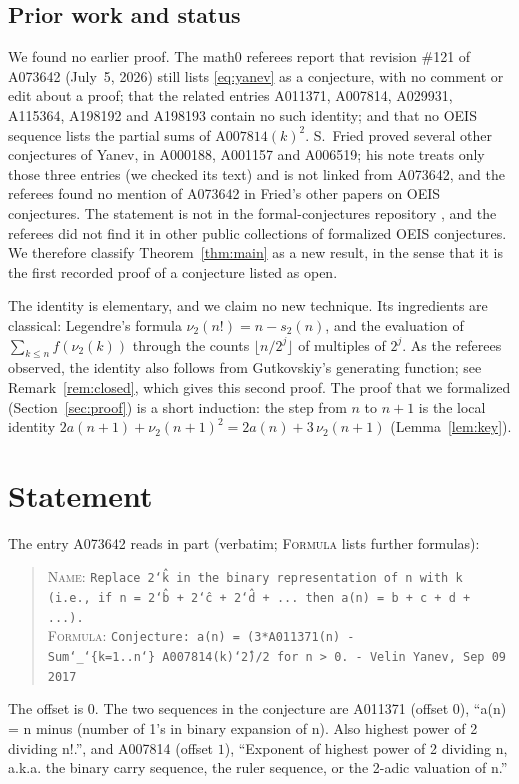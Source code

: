 \documentclass[11pt]{amsart}
\theoremstyle{plain}
\theoremstyle{definition}
\newcommand{\vt}{\nu_2}
\begin{document}
\subsection*{Prior work and status}
We found no earlier proof. The math0 referees report that revision \#121 of A073642 (July~5, 2026) still lists \eqref{eq:yanev} as a conjecture, with no comment or edit about a proof; that the related entries A011371, A007814, A029931, A115364, A198192 and A198193 contain no such identity; and that no OEIS sequence lists the partial sums of $\mathrm{A007814}(k)^2$. S.~Fried \cite{Fried} proved several other conjectures of Yanev, in A000188, A001157 and A006519; his note treats only those three entries (we checked its text) and is not linked from A073642, and the referees found no mention of A073642 in Fried's other papers on OEIS conjectures. The statement is not in the formal-conjectures repository \cite{FC}, and the referees did not find it in other public collections of formalized OEIS conjectures. We therefore classify Theorem~\ref{thm:main} as a new result, in the sense that it is the first recorded proof of a conjecture listed as open.

The identity is elementary, and we claim no new technique. Its ingredients are classical: Legendre's formula $\vt(n!)=n-s_2(n)$, and the evaluation of $\sum_{k\le n}f(\vt(k))$ through the counts $\lfloor n/2^j\rfloor$ of multiples of $2^j$. As the referees observed, the identity also follows from Gutkovskiy's generating function; see Remark~\ref{rem:closed}, which gives this second proof. The proof that we formalized (Section~\ref{sec:proof}) is a short induction: the step from $n$ to $n+1$ is the local identity $2a(n+1)+\vt(n+1)^2=2a(n)+3\,\vt(n+1)$ (Lemma~\ref{lem:key}).

\section{Statement}\label{sec:statement}

The entry A073642 \cite{A073642} reads in part (verbatim; \textsc{Formula} lists further formulas):
\begin{quote}\raggedright
\textsc{Name}: \texttt{Replace 2\char`\^k in the binary representation of n with k (i.e., if n = 2\char`\^b + 2\char`\^c + 2\char`\^d + ... then a(n) = b + c + d + ...).}\\[2pt]
\textsc{Formula}: \texttt{Conjecture: a(n) = (3*A011371(n) - Sum\char`\_\char`\{k=1..n\char`\}\ A007814(k)\char`\^2)/2 for n > 0. - Velin Yanev, Sep 09 2017}
\end{quote}
The offset is $0$. The two sequences in the conjecture are A011371 \cite{A011371} (offset $0$), ``a(n) = n minus (number of 1's in binary expansion of n). Also highest power of 2 dividing n!.'', and A007814 \cite{A007814} (offset $1$), ``Exponent of highest power of 2 dividing n, a.k.a. the binary carry sequence, the ruler sequence, or the 2-adic valuation of n.''
\end{document}
